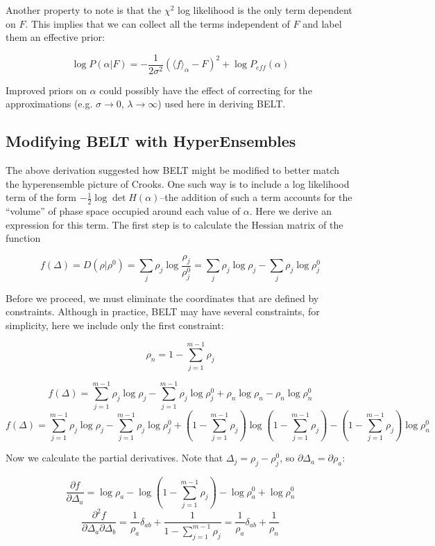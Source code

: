 \documentclass[12pt]{article}
\begin{document}
Another property to note is that the $\chi^2$ log likelihood is the only term dependent on $F$.  This implies that we can collect all the terms independent of $F$ and label them an effective prior:

$$\log P(\alpha | F) = -\frac{1}{2\sigma^2} (\langle f \rangle_\alpha - F)^2 + \log P_{eff}(\alpha)$$

Improved priors on $\alpha$ could possibly have the effect of correcting for the approximations (e.g. $\sigma\rightarrow 0$, $\lambda \rightarrow \infty$) used here in deriving BELT.   

\subsection*{Modifying BELT with HyperEnsembles}

The above derivation suggested how BELT might be modified to better match the hyperensemble picture of Crooks.  One such way is to include a log likelihood term of the form $- \frac{1}{2} \log \det H(\alpha)$--the addition of such a term accounts for the ``volume'' of phase space occupied around each value of $\alpha$.  Here we derive an expression for this term.  The first step is to calculate the Hessian matrix of the function

$$f(\Delta) = D(\rho|\rho^0) = \sum_j \rho_j \log \frac{\rho_j}{\rho^0_j} = \sum_j \rho_j \log \rho_j - \sum_j \rho_j \log \rho^0_j$$

Before we proceed, we must eliminate the coordinates that are defined by constraints.  Although in practice, BELT may have several constraints, for simplicity, here we include only the first constraint:

$$\rho_n = 1 - \sum_{j=1}^{m-1} \rho_j$$

$$f(\Delta) = \sum_{j=1}^{m-1} \rho_j \log \rho_j - \sum_{j=1}^{m-1} \rho_j \log \rho^0_j + \rho_n \log \rho_n - \rho_n \log \rho^0_n$$
$$f(\Delta) = \sum_{j=1}^{m-1} \rho_j \log \rho_j - \sum_{j=1}^{m-1} \rho_j \log \rho^0_j + (1 - \sum_{j=1}^{m-1}\rho_j) \log (1 - \sum_{j=1}^{m-1}\rho_j) - (1 - \sum_{j=1}^{m-1}\rho_j) \log \rho^0_n$$

Now we calculate the partial derivatives.  Note that $\Delta_j = \rho_j - \rho^0_j$, so $\partial \Delta_a = \partial \rho_a$:

$$\frac{\partial f}{\partial \Delta_a} = \log \rho_a - \log (1 - \sum_{j=1}^{m-1} \rho_j) - \log \rho^0_a + \log \rho^0_n$$
$$\frac{\partial^2 f}{\partial \Delta_a \partial \Delta_b} = \frac{1}{\rho_a} \delta_{ab} + \frac{1}{1 - \sum_{j=1}^{m-1} \rho_j} = \frac{1}{\rho_a}\delta_{ab} + \frac{1}{\rho_n}$$
\end{document}

